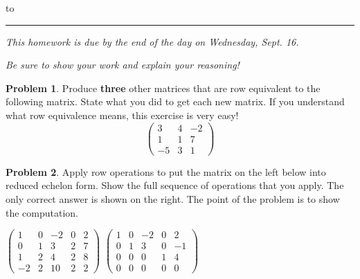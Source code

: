 \documentclass[12pt]{article}
\theoremstyle{definition}
\newtheorem{problem}{Problem}
\newenvironment{answer}{\par\bigskip\bgroup\color{darkblue}}{\egroup}
\begin{document}
\hbox to 
\nointerlineskip
\vskip 2pt
\hrule height 1pt

\medskip

\centerline{\textit{This homework is due by the end of the day on Wednesday, Sept. 16.}}
\centerline{\textit{Be sure to show your work and explain your reasoning!}}

\medskip

\begin{problem}
Produce \textbf{three} other matrices that are row equivalent to the following matrix. 
State what you did to get each new matrix.   If you understand what row equivalence
means, this exercise is very easy!
$$\begin{pmatrix}
    3&4&-2\\
    1&1&7\\
    -5&3&1
\end{pmatrix}$$
\end{problem}

\begin{answer}
\end{answer}


\begin{problem}
Apply row operations to put the matrix on the left below into reduced echelon form.  Show the full sequence
of operations that you apply.  The only correct answer is shown on the right.  The point of the problem is
to show the computation.

\bigskip
\centerline{
 $\begin{pmatrix}
    1 & 0 & -2 & 0 & 2\\
    0 & 1 &  3 & 2 & 7\\
    1 & 2 &  4 & 2 & 8\\
   -2 & 2 & 10 & 2 &2
 \end{pmatrix}$
\qquad\qquad\qquad
 $\begin{pmatrix}
    1 & 0 & -2 & 0 & 2\\
    0 & 1 &  3 & 0 & -1\\
    0 & 0 &  0 & 1 & 4\\
    0 & 0 &  0 & 0 & 0
 \end{pmatrix}$
}

\end{problem}


\begin{answer}
\end{answer}
\end{document}
